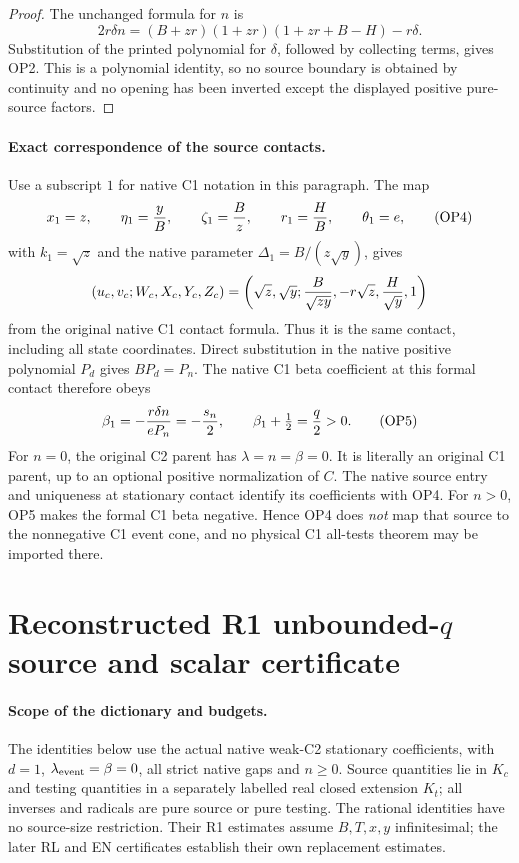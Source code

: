 \begin{proof}
The unchanged formula for $n$ is
\[
 2r\delta n=(B+zr)(1+zr)(1+zr+B-H)-r\delta.
\]
Substitution of the printed polynomial for $\delta$, followed by
collecting terms, gives OP2. This is a polynomial identity, so no
source boundary is obtained by continuity and no opening has been
inverted except the displayed positive pure-source factors.
\end{proof}

\paragraph{Exact correspondence of the source contacts.}
Use a subscript $1$ for native C1 notation in this paragraph. The map
\[
 x_1=z,\qquad \eta_1={y\over B},\qquad
 \zeta_1={B\over z},\qquad r_1={H\over B},\qquad
 \theta_1=e,
 \tag{OP4}
\]
with $k_1=\sqrt z$ and the native parameter
$\Delta_1=B/(z\sqrt y)$, gives
\[
 (u_c,v_c;W_c,X_c,Y_c,Z_c)
 =\left(\sqrt z,\sqrt y;{B\over\sqrt{zy}},
                       -r\sqrt z,{H\over\sqrt y},1\right)
\]
from the original native C1 contact formula. Thus it is the same
contact, including all state coordinates. Direct substitution in the
native positive polynomial $P_d$ gives $BP_d=P_n$.
The native C1 beta coefficient at this formal contact therefore obeys
\[
 \beta_1=-{r\delta n\over eP_n}=-{s_n\over2},
 \qquad \beta_1+\tfrac12={q\over2}>0.                 \tag{OP5}
\]
For $n=0$, the original C2 parent has
$\lambda=n=\beta=0$. It is literally an original C1 parent,
up to an optional positive normalization of $C$. The native source
entry and uniqueness at stationary contact identify its coefficients
with OP4. For $n>0$, OP5 makes the formal C1 beta negative. Hence
OP4 does \emph{not} map that source to the nonnegative C1 event cone,
and no physical C1 all-tests theorem may be imported there.



\section{\texorpdfstring{Reconstructed R1 unbounded-$q$ source and scalar certificate}{Reconstructed R1 unbounded-q source and scalar certificate}}
\label{component:p9e725a065583}

\label{p9e725a065583:sec:reconstructed-r1-qo-source-scalar}

\paragraph{Scope of the dictionary and budgets.}
The identities below use the actual native weak-C2 stationary coefficients,
with $d=1$, $\lambda_{\rm event}=\beta=0$, all strict native gaps and
$n\ge0$. Source quantities lie in $K_c$ and testing quantities in a
separately labelled real closed extension $K_t$; all inverses and radicals
are pure source or pure testing. The rational identities have no source-size
restriction. Their R1 estimates assume $B,T,x,y$ infinitesimal; the later
RL and EN certificates establish their own replacement estimates.

